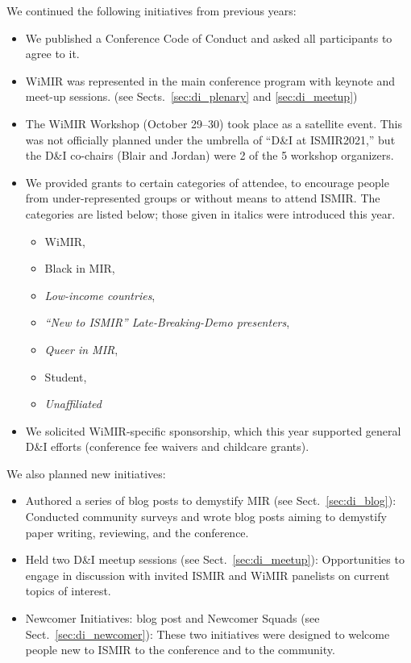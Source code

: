\documentclass[%
10pt,								%
titlepage,						%
]
{scrartcl}
\begin{document}
        We continued the following initiatives from previous years:
        \begin{itemize}
            \item   We published a Conference Code of Conduct and asked all participants to agree to it.
            \item   WiMIR was represented in the main conference program with keynote and meet-up sessions. (see Sects.~\ref{sec:di_plenary} and \ref{sec:di_meetup})
            \item   The WiMIR Workshop (October 29--30) took place as a satellite event. This was not officially planned under the umbrella of ``D\&I at ISMIR2021,'' but the D\&I co-chairs (Blair and Jordan) were 2 of the 5 workshop organizers.
            \item   We provided grants to certain categories of attendee, to encourage people from under-represented groups or without means to attend ISMIR. The categories are listed below; those given in italics were introduced this year.
                \begin{itemize}
                    \item   WiMIR,
                    \item   Black in MIR,
                    \item   \textit{Low-income countries},
                    \item   \textit{``New to ISMIR'' Late-Breaking-Demo presenters},
                    \item   \textit{Queer in MIR},
                    \item   Student,
                    \item   \textit{Unaffiliated}
                \end{itemize}
            \item   We solicited WiMIR-specific sponsorship, which this year supported general D\&I efforts (conference fee waivers and childcare grants).
        \end{itemize}

        We also planned new initiatives:
        \begin{itemize}
            \item   Authored a series of blog posts to demystify MIR (see Sect.~\ref{sec:di_blog}):
               Conducted community surveys and wrote blog posts aiming to demystify paper writing, reviewing, and the conference.
            \item   Held two D\&I meetup sessions (see Sect.~\ref{sec:di_meetup}):
               Opportunities to engage in discussion with invited ISMIR and WiMIR panelists on current topics of interest. 
            \item   Newcomer Initiatives: blog post and Newcomer Squads (see Sect.~\ref{sec:di_newcomer}):
               These two initiatives were designed to welcome people new to ISMIR to the conference and to the community.
        \end{itemize}
\end{document}
